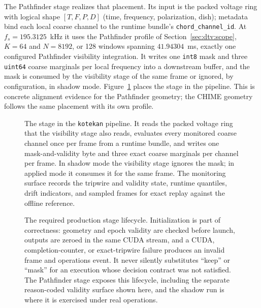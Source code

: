 The Pathfinder stage realizes that placement.  Its input is the packed
voltage ring with logical shape $[T,F,P,D]$ (time, frequency, polarization,
dish); metadata bind each local coarse channel to the runtime bundle's
\texttt{chord\_channel\_id}.  At $f_s = 195.3125$~kHz it uses the Pathfinder
profile of Section~\ref{sec:dtv:scope}, $K=64$ and $N=8192$, or 128 windows
spanning $41.94304$~ms, exactly one configured Pathfinder visibility
integration.  It writes one \texttt{int8} mask and three \texttt{uint64} coarse
marginals per local frequency into a downstream buffer, and the mask is
consumed by the visibility stage of the same frame or ignored, by
configuration, in shadow mode.  Figure~\ref{fig:deployment:pipeline} places the
stage in the pipeline.  This is concrete alignment evidence for the Pathfinder
geometry; the CHIME geometry follows the same placement with its own profile.

\begin{figure}[t]
\centering
\resizebox{\linewidth}{!}{}
\caption[The stage in the \texttt{kotekan} pipeline]{The stage in the \texttt{kotekan} pipeline. It reads the packed voltage ring that the visibility stage also reads, evaluates every monitored coarse channel once per frame from a runtime bundle, and writes one mask-and-validity byte and three exact coarse marginals per channel per frame. In shadow mode the visibility stage ignores the mask; in applied mode it consumes it for the same frame. The monitoring surface records the tripwire and validity state, runtime quantiles, drift indicators, and sampled frames for exact replay against the offline reference.}
\label{fig:deployment:pipeline}
\end{figure}

\begin{figure}[t]
\centering
\resizebox{\linewidth}{!}{}
\caption[Real-time stage lifecycle and failure semantics]{The required production
stage lifecycle.  Initialization is part of correctness: geometry and epoch
validity are checked before launch, outputs are zeroed in the same CUDA stream,
and a CUDA, completion-counter, or exact-tripwire failure produces an invalid
frame and operations event.  It never silently substitutes ``keep'' or ``mask''
for an execution whose decision contract was not satisfied.  The Pathfinder stage
exposes this lifecycle, including the separate reason-coded validity surface
shown here, and the shadow run is where it is exercised under real operations.}
\label{fig:deployment:lifecycle}
\end{figure}

